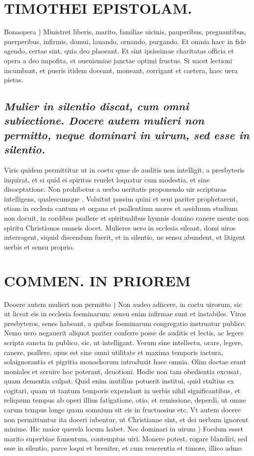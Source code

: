 \documentclass{article}
\begin{document}
\begin{pages}
\section*{TIMOTHEI EPISTOLAM. }
\marginpar{[ p.60 ]}\pstart Bonaopera ) Ministret liberis, marito, familiae uicinis, pauperibus, pregnantibus, puerperibus, infirmis, domui, lauando, ornando, purgando. Et omnia haec in fide agendo, certae sint, quia deo plaoeant. Et sint ipsissimae charitatas officia et opera a deo impofita, et oueuiemiae janctae optimi fructus. Si uacet lectioni incumbant, et pueris itidem doceant, moneant, corrigant et caetera, haec uera pietas.  \pend
{}
{}
\subsection*{\textit{Mulier in silentio discat, cum omni subiectione. Docere autem mulieri non permitto, neque dominari in uirum, sed esse in silentio. }}\pstart Viris quidem permittitur ut in coetu quae de auditis non intelligit, a presbyteris inquirat, et si quid ei spiritus reuelet loquatur cum modestia, et sine disoeptatione. Non prohibetur a uerbo ueritatis proponendo uir scripturas intelligens, qualescumque . Voluitut passim quini et seni pariter prophetarent, etiam in ecclesia cantum et organa et psallentium mores et assiduum studium non docuit, in cordibus psallere et spiritualibus hymnis domino canere mente non spiritu Christianos omneis docet. Mulieres uero in ecclesia sileant, domi uiros interrogent, siquid discendum fuerit, et in silentio, ne sensu abundent, et litigent uerbis et sensu proprio.  \pend
\section*{COMMEN. IN PRIOREM }
\marginpar{[ p.61 ]}\pstart Dooere autem mulieri non permitto ) Non audeo adiicere, in coetu uirorum, sic ut liceat eis in ecclesia foeminarum: sensu enim infirmae sunt et instabiles. Viros presbyteros, senes habeant, a quibus foeminarum congregatio instruatur publice. Nemo uero negauerit aliquot pariter conferre posse de auditis et lectis, ac legere scripta sancta in publico, sic, ut intelligant. Verum sine intellectu, orare, legere, canere, psallere, opus est sine omni utilitate et maxima temporis iactura, solaignorantia et pigritia monachorum introduxit haec omnia. Olim doctae erant moniales et seruire hoc poterant, deuotioni. Hodie non tam obedientia excusat, quam dementia culpat. Quid enim inutilius potuerit institui, quid stultius ex cogitari, quam ut tantum temporis expendant in uerbis nihil significantibus, et reliquum tempus ab operi illius fatigatione, otio, et remissione, deperdi, ut omne carum tempus longe quam somnium sit eis in fructuosius etc. Vt autem docere non permittuntur ita doceri iubentur, ut Christianae sint, et dei uerbum ignorent minime. Hic maior querela locum habet.  \pend\pstart Nec dominari in uirum ) Foedum esset marito superbiae fomentum, contemptus uiri. Monere potest, rogare blandiri, sed esse in silentio, parce loqui et breuiter, et cum reuerentia et timore, illico admo\pend

\end{pages}
\end{document}
